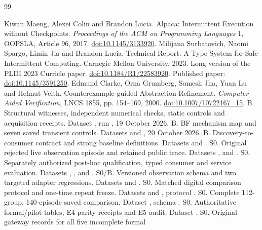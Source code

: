 \documentclass[10pt]{article}
\begin{document}
\begin{thebibliography}{99}
\footnotesize\raggedright
\setlength{\itemsep}{1pt}\setlength{\parsep}{0pt}\setlength{\parskip}{0pt}
 Kiwan Maeng, Alexei Colin and Brandon Lucia.
Alpaca: Intermittent Execution without Checkpoints.
\emph{Proceedings of the ACM on Programming Languages} 1, OOPSLA,
Article 96, 2017. \href{https://doi.org/10.1145/3133920}{doi:10.1145/3133920}.
 Milijana Surbatovich, Naomi Spargo, Limin Jia and Brandon
Lucia. Technical Report: A Type System for Safe Intermittent Computing.
Carnegie Mellon University, 2023. Long version of the PLDI 2023 Curricle paper.
\href{https://doi.org/10.1184/R1/22583920}{doi:10.1184/R1/22583920}.
Published paper: \href{https://doi.org/10.1145/3591250}{doi:10.1145/3591250}.
 Edmund Clarke, Orna Grumberg, Somesh Jha, Yuan Lu and
Helmut Veith. Counterexample-guided Abstraction Refinement.
\emph{Computer Aided Verification}, LNCS 1855, pp. 154--169, 2000.
\href{https://doi.org/10.1007/10722167_15}{doi:10.1007/10722167\_15}.
 B. Structural witnesses, independent numerical checks,
static controls and acquisition receipts. Dataset
, run , 19 October 2026.
 B. BF mechanism map and seven saved transient controls.
Datasets  and , 20 October 2026.
 B. Discovery-to-consumer contract and strong baseline
definitions. Datasets  and .
 S0. Original rejected live observation episode and retained
public trace. Datasets , 
and .
 S0. Separately authorized post-hoc qualification, typed
consumer and service evaluation. Datasets ,
,  and .
 S0/B. Versioned observation schema and two targeted adapter
regressions. Datasets  and .
 S0. Matched digital comparison protocol and one-time repeat
freeze. Datasets  and ,
protocol .
 S0. Complete 112-group, 140-episode saved comparison.
Dataset , schema
.
 S0. Authoritative formal/pilot tables, E4 parity receipts and
E5 audit. Dataset .
 S0. Original gateway records for all five incomplete formal

\end{thebibliography}
\end{document}
